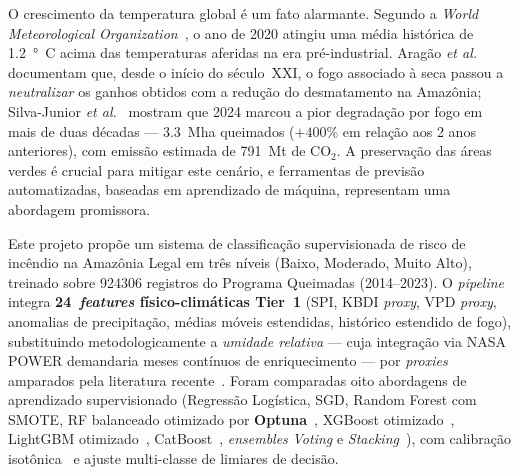 O crescimento da temperatura global é um fato alarmante. Segundo a \emph{World Meteorological Organization}~\cite{wmo2021}, o ano de 2020 atingiu uma média histórica de \SI{1,2}{\degree C} acima das temperaturas aferidas na era pré-industrial. Aragão \emph{et al.}~\cite{aragao2018amazon} documentam que, desde o início do século~XXI, o fogo associado à seca passou a \emph{neutralizar} os ganhos obtidos com a redução do desmatamento na Amazônia; Silva-Junior \emph{et al.}~\cite{silvajunior2025amazon} mostram que 2024 marcou a pior degradação por fogo em mais de duas décadas --- \SI{3,3}{\mega\hectare} queimados (\(+400\%\) em relação aos 2 anos anteriores), com emissão estimada de \SI{791}{\mega\tonne} de CO$_{2}$. A preservação das áreas verdes é crucial para mitigar este cenário, e ferramentas de previsão automatizadas, baseadas em aprendizado de máquina, representam uma abordagem promissora.

Este projeto propõe um sistema de classificação supervisionada de risco de incêndio na Amazônia Legal em três níveis (Baixo, Moderado, Muito Alto), treinado sobre \num{924306} registros do Programa Queimadas (2014--2023). O \emph{pipeline} integra \textbf{24~\emph{features} físico-climáticas Tier~1} (SPI, KBDI \emph{proxy}, VPD \emph{proxy}, anomalias de precipitação, médias móveis estendidas, histórico estendido de fogo), substituindo metodologicamente a \emph{umidade relativa} --- cuja integração via NASA POWER demandaria meses contínuos de enriquecimento --- por \emph{proxies} amparados pela literatura recente~\cite{seager2015climatology,forests2024cerradoamazon,npjhazards2025fire}. Foram comparadas oito abordagens de aprendizado supervisionado (Regressão Logística, SGD, Random Forest com SMOTE, RF balanceado otimizado por \textbf{Optuna}~\cite{akiba2019optuna}, XGBoost otimizado~\cite{chen2016xgboost}, LightGBM otimizado~\cite{ke2017lightgbm}, CatBoost~\cite{prokhorenkova2018catboost}, \emph{ensembles} \emph{Voting} e \emph{Stacking}~\cite{wolpert1992stacked}), com calibração isotônica~\cite{zadrozny2002transforming} e ajuste multi-classe de limiares de decisão.

